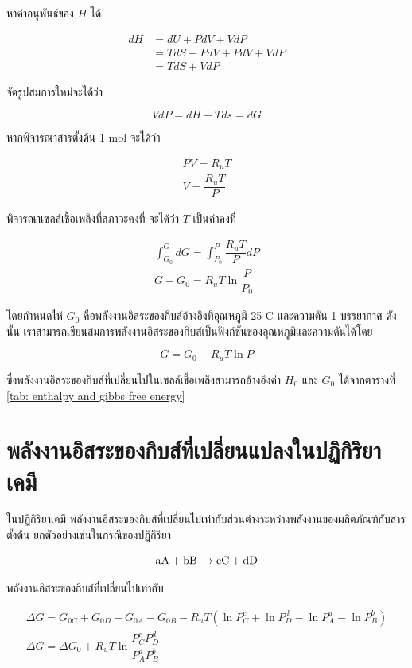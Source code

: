 \documentclass[a4paper,nobib,openany,10pt]{tufte-book}
\begin{document}
หาค่าอนุพันธ์ของ \(H\) ได้

\[\begin{aligned}
  dH &= dU + PdV + VdP \nonumber \\
     &= TdS - PdV + PdV + VdP \nonumber \\
     &= TdS + VdP\end{aligned}\]

จัดรูปสมการใหม่จะได้ว่า

\[VdP = dH - Tds = dG\]

หากพิจารณาสารตั้งต้น 1 mol จะได้ว่า

\begin{gather*}
\label{eq:ideal gas equation}
  PV = R_u T \\
  V = \dfrac{R_u T}{P}
\end{gather*}

พิจารณาเซลล์เชื้อเพลิงที่สภาวะคงที่ จะได้ว่า \(T\) เป็นค่าคงที่

\begin{gather*}
\label{eq:gfe integral equation}
  \int_{G_0}^G dG = \int_{P_0}^P \dfrac{R_uT}{P}dP \\
  G - G_0 = R_u T \ln \dfrac{P}{P_0}
\end{gather*}

โดยกำหนดให้ \(G_0\) คือพลังงานอิสระของกิบส์อ้างอิงที่อุณหภูมิ 25 C
และความดัน 1 บรรยากาศ ดังนั้น
เราสามารถเขียนสมการพลังงานอิสระของกิบส์เป็นฟังก์ชันของอุณหภูมิและความดันได้โดย

\[G = G_0 + R_u T \ln P\]

ซึ่งพลังงานอิสระของกิบส์ที่เปลี่ยนไปในเซลล์เชื้อเพลิงสามารถอ้างอิงค่า
\(H_0\) และ \(G_0\) ได้จากตารางที่ \ref{tab: enthalpy and gibbs free energy}

\section{พลังงานอิสระของกิบส์ที่เปลี่ยนแปลงในปฏิกิริยาเคมี}
\label{sec:orga5c6b35}
ในปฏิกิริยาเคมี
พลังงานอิสระของกิบส์ที่เปลี่ยนไปเท่ากับส่วนต่างระหว่างพลังงานของผลิตภัณฑ์กับสารตั้งต้น
ยกตัวอย่างเช่นในกรณีของปฏิกิริยา

\[\ce{aA + bB \rightarrow cC + dD}\]

พลังงานอิสระของกิบส์ที่เปลี่ยนไปเท่ากับ

\begin{gather*}
  \Delta G = G_{0C} + G_{0D} - G_{0A} - G_{0B} - R_u T \left( \ln P_C^c + \ln P_D^d - \ln P_A^a - \ln P_B^b \right) \nonumber \\
  \Delta G = \Delta G_0 + R_u T \ln \dfrac{P_C^c P_D^d}{P_A^a P_B^b}
\end{gather*}
\end{document}
